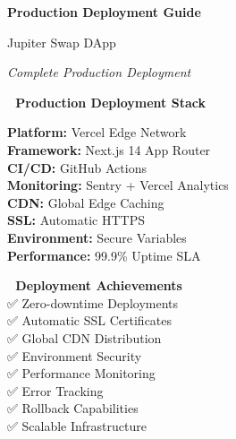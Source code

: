 \documentclass[11pt,a4paper]{article}
\begin{document}
\begin{titlepage}
    \centering
    \vspace*{1cm}
    
    {\Huge\textbf{\textcolor{jupiterBlue}{Production Deployment Guide}}\par}
    \vspace{0.5cm}
    {\LARGE\textcolor{deauraPurple}{Jupiter Swap DApp}\par}
    \vspace{0.3cm}
    {\Large\textit{Complete Production Deployment}\par}
    
    \vspace{1.5cm}
    
    \begin{tcolorbox}[colback=jupiterBlue!10,colframe=jupiterBlue,width=0.9\textwidth]
        \centering
        \textbf{🚀 Production Deployment Stack}\\
        \vspace{0.5cm}
        \begin{multicols}{2}
        \textbf{Platform:} Vercel Edge Network\\
        \textbf{Framework:} Next.js 14 App Router\\
        \textbf{CI/CD:} GitHub Actions\\
        \textbf{Monitoring:} Sentry + Vercel Analytics\\
        \textbf{CDN:} Global Edge Caching\\
        \textbf{SSL:} Automatic HTTPS\\
        \textbf{Environment:} Secure Variables\\
        \textbf{Performance:} 99.9\% Uptime SLA
        \end{multicols}
    \end{tcolorbox}
    
    \vspace{1.5cm}
    
    \begin{tcolorbox}[colback=successGreen!10,colframe=successGreen,width=0.8\textwidth]
        \centering
        \textbf{🎯 Deployment Achievements}\\
        \vspace{0.3cm}
        ✅ Zero-downtime Deployments\\
        ✅ Automatic SSL Certificates\\
        ✅ Global CDN Distribution\\
        ✅ Environment Security\\
        ✅ Performance Monitoring\\
        ✅ Error Tracking\\
        ✅ Rollback Capabilities\\
        ✅ Scalable Infrastructure
    \end{tcolorbox}
    

\end{titlepage}
\end{document}
